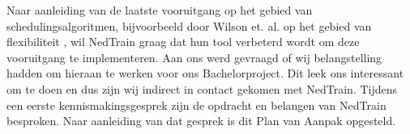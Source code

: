 Naar aanleiding van de laatste vooruitgang op het gebied van schedulingsalgoritmen, bijvoorbeeld door Wilson et. al. op het gebied van flexibiliteit \cite{wilson2013flexibility}, wil NedTrain graag dat hun tool verbeterd wordt om deze vooruitgang te implementeren. Aan ons werd gevraagd of wij belangstelling hadden om hieraan te werken voor ons Bachelorproject. Dit leek ons interessant om te doen en dus zijn wij indirect in contact gekomen met NedTrain. Tijdens een eerste kennismakingsgesprek zijn de opdracht en belangen van NedTrain besproken. Naar aanleiding van dat gesprek is dit Plan van Aanpak opgesteld.
